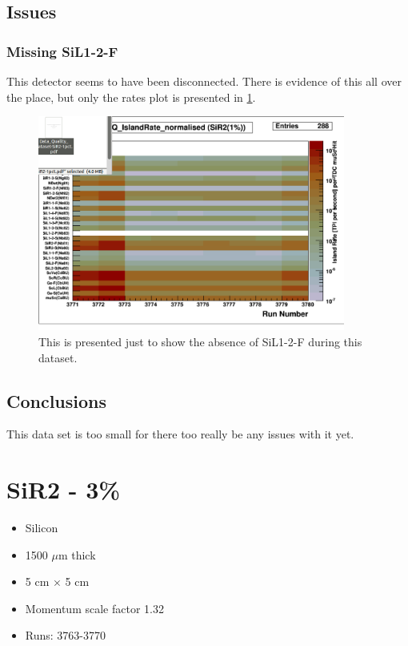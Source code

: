 \documentclass[a4paper]{article}
\begin{document}
\subsection{Issues}
\subsubsection{Missing SiL1-2-F}
\label{sec:sir1pct_missing_det}
This detector seems to have been disconnected. There is evidence of this all over the place, but only the rates plot is
presented in \ref{fig:sir1pct_rates}.

\begin{figure}
  \centering
  \includegraphics[width=0.9\textwidth]{figs/sir1pct/rates}
  \caption{This is presented just to show the absence of SiL1-2-F during this dataset.}
  \label{fig:sir1pct_rates}
\end{figure}


\subsection{Conclusions}
This data set is too small for there too really be any issues with it yet.


\section{SiR2 - 3\%}
\begin{itemize}
  \item Silicon
  \item 1500 $\mu$m thick
  \item 5 cm $\times$ 5 cm
  \item Momentum scale factor 1.32
  \item Runs:
    3763-3770
\end{itemize}
\end{document}
